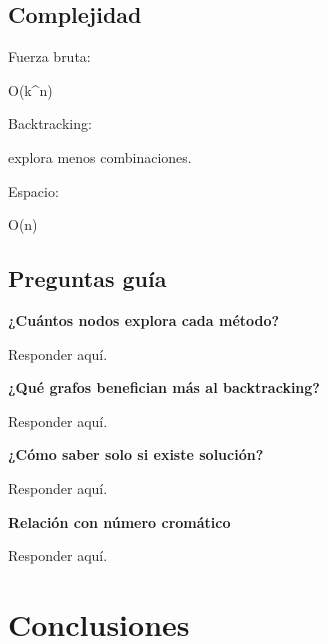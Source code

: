 \documentclass[12pt]{article}
\begin{document}
\subsection{Complejidad}

\begin{respuesta}

Fuerza bruta:

O(k^n)

Backtracking:

explora menos combinaciones.

Espacio:

O(n)

\end{respuesta}

\subsection{Preguntas guía}

\textbf{¿Cuántos nodos explora cada método?}

\begin{respuesta}

Responder aquí.

\end{respuesta}

\textbf{¿Qué grafos benefician más al backtracking?}

\begin{respuesta}

Responder aquí.

\end{respuesta}

\textbf{¿Cómo saber solo si existe solución?}

\begin{respuesta}

Responder aquí.

\end{respuesta}

\textbf{Relación con número cromático}

\begin{respuesta}

Responder aquí.

\end{respuesta}


\section{Conclusiones}
\end{document}
